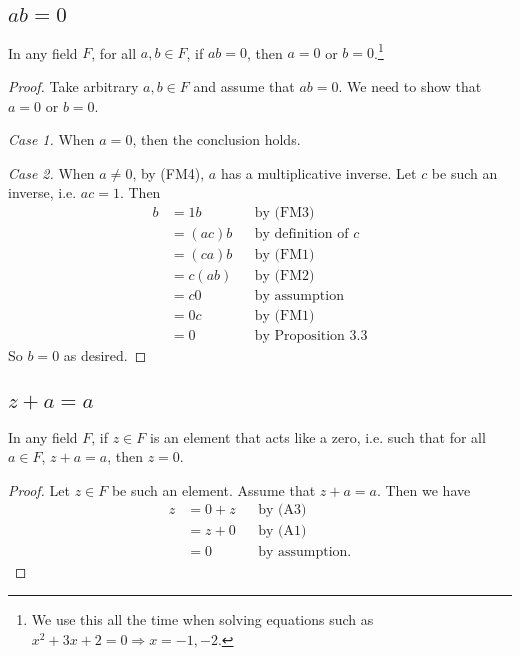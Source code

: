 \documentclass[11pt]{article}
\begin{document}
    \subsection{$ab=0$}

    In any field $F$, for all \(a,b \in F\), if \(ab = 0\), then \(a = 0\) or \(b = 0\).\footnote{We use this all the time when solving equations such as \(x^2 + 3x + 2 = 0 \Rightarrow x = -1, -2.\)}

    \begin{proof}
        Take arbitrary \(a,b \in F\) and assume that \(ab = 0\). We need to show that \(a = 0\) or \(b = 0\).

        \vspace{1em}

        \emph{Case 1.} When $a = 0$, then the conclusion holds.

        \emph{Case 2.} When \(a \neq 0\), by (FM4), $a$ has a multiplicative inverse. Let $c$ be such an inverse, i.e. $ac = 1$. Then
        \begin{align*}
            b &= 1b     && \text{by (FM3)} \\
              &= (ac)b  && \text{by definition of $c$} \\
              &= (ca)b  && \text{by (FM1)} \\
              &= c(ab)  && \text{by (FM2)} \\
              &= c0     && \text{by assumption} \\
              &= 0c     && \text{by (FM1)} \\
              &= 0      && \text{by Proposition 3.3} 
        \end{align*}
        So \(b = 0\) as desired.
    \end{proof}

    \subsection{$z + a = a$}

    In any field $F$, if $z \in F$ is an element that acts like a zero, i.e. such that for all \(a \in F\), \(z + a = a\), then \(z = 0.\)
    \begin{proof}
        Let \(z \in F\) be such an element. Assume that \(z + a = a.\) Then we have 
        \begin{align*}
            z &= 0 + z      && \text{by (A3)} \\
              &= z + 0      && \text{by (A1)} \\
              &= 0          && \text{by assumption.}
        \end{align*}
    \end{proof}
\end{document}

